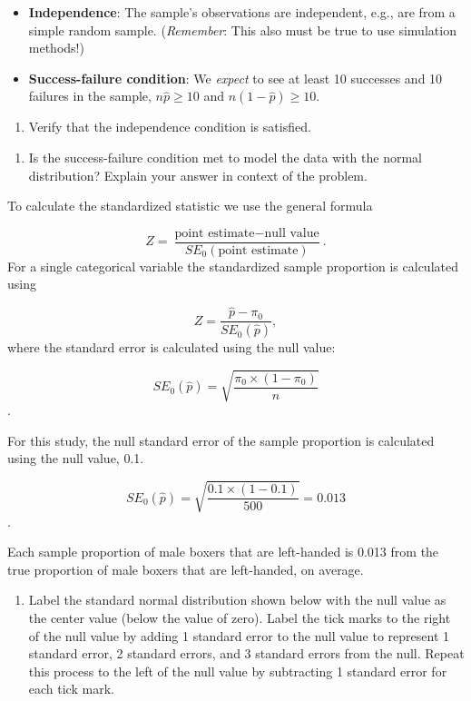 \documentclass[
]{report}
\providecommand{\tightlist}{%
  \setlength{\itemsep}{0pt}\setlength{\parskip}{0pt}}
\begin{document}
\begin{itemize}
\item
  \textbf{Independence}: The sample's observations are independent, e.g., are from a simple random sample. (\emph{Remember}: This also must be true to use simulation methods!)
\item
  \textbf{Success-failure condition}: We \emph{expect} to see at least 10 successes and 10 failures in the sample, \(n\hat{p}≥10\) and \(n(1-\hat{p})≥10\).
\end{itemize}

\begin{enumerate}
\def\labelenumi{\arabic{enumi}.}
\setcounter{enumi}{5}
\tightlist
\item
  Verify that the independence condition is satisfied.
\end{enumerate}

\vspace{0.5in}

\begin{enumerate}
\def\labelenumi{\arabic{enumi}.}
\setcounter{enumi}{6}
\tightlist
\item
  Is the success-failure condition met to model the data with the normal distribution? Explain your answer in context of the problem.
\end{enumerate}

\vspace{0.8in}

To calculate the standardized statistic we use the general formula

\[
Z = \frac{\text{point estimate} - \text{null value}}{SE_0(\text{point estimate})}.
\]
For a single categorical variable the standardized sample proportion is calculated using

\[
Z = \frac{\hat{p} - \pi_0}{SE_0(\hat{p})},
\]
where the standard error is calculated using the null value:

\[SE_0(\hat{p})=\sqrt{\frac{\pi_0\times(1-\pi_0)}{n}}\].

For this study, the null standard error of the sample proportion is calculated using the null value, 0.1.

\[SE_0(\hat{p})=\sqrt{\frac{0.1\times(1-0.1)}{500}} = 0.013\].

Each sample proportion of male boxers that are left-handed is 0.013 from the true proportion of male boxers that are left-handed, on average.

\newpage

\begin{enumerate}
\def\labelenumi{\arabic{enumi}.}
\setcounter{enumi}{7}
\tightlist
\item
  Label the standard normal distribution shown below with the null value as the center value (below the value of zero). Label the tick marks to the right of the null value by adding 1 standard error to the null value to represent 1 standard error, 2 standard errors, and 3 standard errors from the null. Repeat this process to the left of the null value by subtracting 1 standard error for each tick mark.
\end{enumerate}
\end{document}
